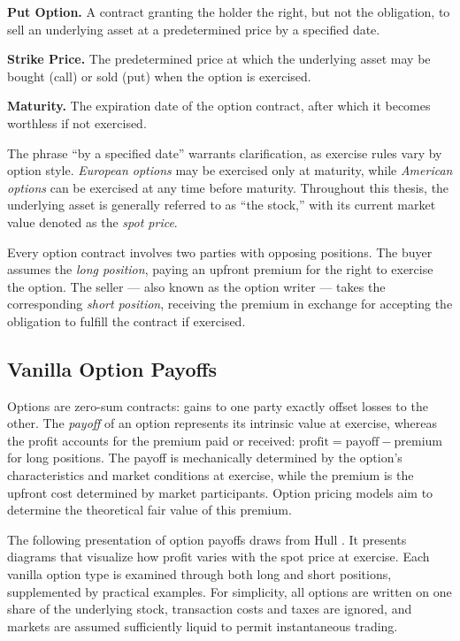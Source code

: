 \documentclass[english,12pt,a4paper,pdftex,sci,utf8]{aaltothesis}
\begin{document}
\vspace{0.5\baselineskip}
\noindent\textbf{Put Option.} A contract granting the holder the right, but not the obligation, to sell an underlying asset at a predetermined price by a specified date.

\vspace{0.5\baselineskip}
\noindent\textbf{Strike Price.} The predetermined price at which the underlying asset may be bought (call) or sold (put) when the option is exercised.

\vspace{0.5\baselineskip}
\noindent\textbf{Maturity.} The expiration date of the option contract, after which it becomes worthless if not exercised.

\vspace{\baselineskip}
\noindent The phrase ``by a specified date'' warrants clarification, as exercise rules vary by option style. \emph{European options} may be exercised only at maturity, while \emph{American options} can be exercised at any time before maturity. Throughout this thesis, the underlying asset is generally referred to as ``the stock,'' with its current market value denoted as the \emph{spot price}.

Every option contract involves two parties with opposing positions. The buyer assumes the \emph{long position}, paying an upfront premium for the right to exercise the option. The seller --- also known as the option writer --- takes the corresponding \emph{short position}, receiving the premium in exchange for accepting the obligation to fulfill the contract if exercised.

\clearpage
\subsection{Vanilla Option Payoffs}\label{subsec:payoffs}

Options are zero-sum contracts: gains to one party exactly offset losses to the other. The \emph{payoff} of an option represents its intrinsic value at exercise, whereas the profit accounts for the premium paid or received: \mbox{$\text{profit} = \text{payoff} - \text{premium}$} for long positions. The payoff is mechanically determined by the option's characteristics and market conditions at exercise, while the premium is the upfront cost determined by market participants. Option pricing models aim to determine the theoretical fair value of this premium.

The following presentation of option payoffs draws from Hull \cite{hull2018}. It presents diagrams that visualize how profit varies with the spot price at exercise. Each vanilla option type is examined through both long and short positions, supplemented by practical examples. For simplicity, all options are written on one share of the underlying stock, transaction costs and taxes are ignored, and markets are assumed sufficiently liquid to permit instantaneous trading.
\end{document}
